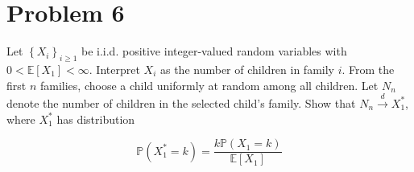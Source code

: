 \documentclass{qlnotes-export}
\begin{document}
\section{Problem 6}\label{problem-6-5}

Let \(\left\{ X_{i} \right\}_{i \geq 1}\) be i.i.d. positive integer-valued random variables with \(0 < {\mathbb{E}}\left\lbrack X_{1} \right\rbrack < \infty\). Interpret \(X_{i}\) as the number of children in family \(i\). From the first \(n\) families, choose a child uniformly at random among all children. Let \(N_{n}\) denote the number of children in the selected child's family. Show that \(N_{n}\overset{d}{\rightarrow}X_{1}^{\ast}\), where \(X_{1}^{\ast}\) has distribution

\[{\mathbb{P}}\left( {X_{1}^{\ast} = k} \right) = \frac{k{\mathbb{P}}\left( {X_{1} = k} \right)}{{\mathbb{E}}\left\lbrack X_{1} \right\rbrack}\]
\end{document}
